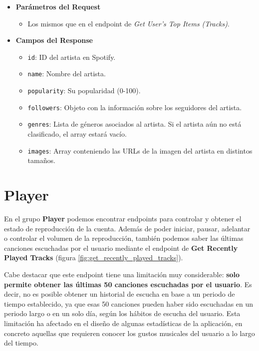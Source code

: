 \begin{itemize}
    \item \textbf{Parámetros del Request}
          \begin{itemize}
              \item Los mismos que en el endpoint de \textit{Get User's Top Items (Tracks)}.
          \end{itemize}

    \item \textbf{Campos del Response}
          \begin{itemize}
              \item \texttt{id}: ID del artista en Spotify.
              \item \texttt{name}: Nombre del artista.
              \item \texttt{popularity}: Su popularidad (0-100).
              \item \texttt{followers}: Objeto con la información sobre los seguidores del artista.
              \item \texttt{genres}: Lista de géneros asociados al artista. Si el artista aún no está clasificado, el array estará vacío.
              \item \texttt{images}: Array conteniendo las URLs de la imagen del artista en distintos tamaños.
          \end{itemize}

\end{itemize}

\section*{Player}

En el grupo \textbf{Player} podemos encontrar endpoints para controlar y obtener el estado de reproducción de la cuenta. Además de poder iniciar, pausar, adelantar o controlar el volumen de la reproducción, también podemos saber las últimas canciones escuchadas por el usuario mediante el endpoint de \textbf{Get Recently Played Tracks} (figura \ref{fig:get_recently_played_tracks}).

Cabe destacar que este endpoint tiene una limitación muy considerable: \textbf{solo permite obtener las últimas 50 canciones escuchadas por el usuario}. Es decir, no es posible obtener un historial de escucha en base a un periodo de tiempo establecido, ya que esas 50 canciones pueden haber sido escuchadas en un periodo largo o en un solo día, según los hábitos de escucha del usuario. Esta limitación ha afectado en el diseño de algunas estadísticas de la aplicación, en concreto aquellas que requieren conocer los gustos musicales del usuario a lo largo del tiempo.

